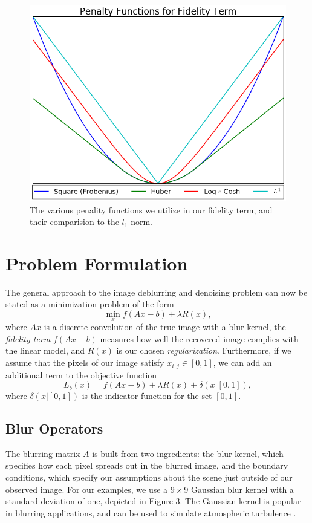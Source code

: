 \documentclass[10pt,a4paper]{article}
\begin{document}
	\begin{figure}[H]\label{penalties}
		\centering
		\includegraphics[scale=.35]{../figures/penalty_functions.png} 
		\caption{The various penality functions we utilize in our fidelity term, and their comparision to the $l_1$ norm.}
	\end{figure}
	
	\newpage
	\section{Problem Formulation}
	The general approach to the image deblurring and denoising problem can now be stated as a minimization problem of the form
	\begin{equation} \label{general}
	\min_x f(Ax -b) + \lambda R(x),
	\end{equation}
	where $Ax$ is a discrete convolution of the true image with a blur kernel, the  \emph{fidelity term} $f(Ax-b)$ measures how well the recovered image complies with the linear model, and $R(x)$ is our chosen \emph{regularization}. Furthermore, if we assume that the pixels of our image satisfy $x_{i,j} \in [0,1]$, we can add an additional term to the objective function
	\begin{equation} \label{loss}
	L_b(x) = f(Ax-b) + \lambda R(x) + \delta(x | [0,1] ),
	\end{equation}
	where $\delta(x | [0,1])$ is the indicator function for the set $[0,1]$. 
	
	\subsection{Blur Operators}
	The blurring matrix $A$ is built from two ingredients: the blur kernel, which specifies how each pixel spreads out in the blurred image, and the boundary conditions, which specify our assumptions about the scene just outside of our observed image. For our examples, we use a $9 \times 9$ Gaussian blur kernel with a standard deviation of one, depicted in Figure 3. The Gaussian kernel is popular in blurring applications, and can be used to simulate atmospheric turbulence \cite{DeblurBook}. 
	
\end{document}
